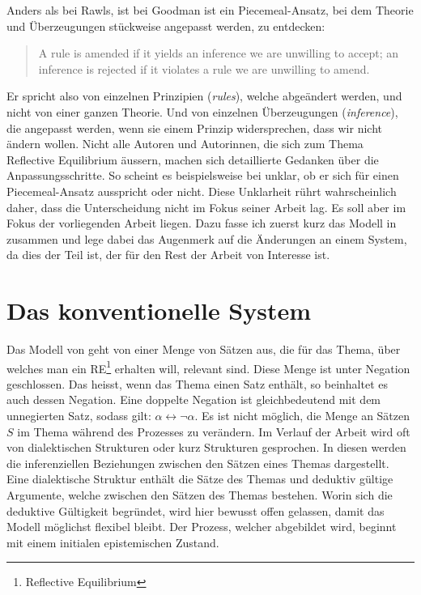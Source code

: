 \documentclass{article}
\begin{document}
Anders als bei Rawls, ist bei Goodman ist ein Piecemeal-Ansatz, bei dem Theorie und Überzeugungen stückweise angepasst werden, zu entdecken:

\begin{quote}
    A rule is amended if it yields an inference we are unwilling to accept; an inference is rejected if it violates a rule we are unwilling to amend. \parencite[S.~64]{goodman_fact_1983}
\end{quote}

Er spricht also von einzelnen Prinzipien (\textit{rules}), welche abgeändert werden, und nicht von einer ganzen Theorie. Und von einzelnen Überzeugungen (\textit{inference}), die angepasst werden, wenn sie einem Prinzip widersprechen, dass wir nicht ändern wollen. Nicht alle Autoren und Autorinnen, die sich zum Thema Reflective Equilibrium äussern, machen sich detaillierte Gedanken über die Anpassungsschritte. So scheint es beispielsweise bei \cite{tersman_reflective_1993} unklar, ob er sich für einen Piecemeal-Ansatz ausspricht oder nicht. Diese Unklarheit rührt wahrscheinlich daher, dass die Unterscheidung nicht im Fokus seiner Arbeit lag. Es soll aber im Fokus der vorliegenden Arbeit liegen. Dazu fasse ich zuerst kurz das Modell in \cite{beisbart_making_2021} zusammen und lege dabei das Augenmerk auf die Änderungen an einem System, da dies der Teil ist, der für den Rest der Arbeit von Interesse ist.

\section{Das konventionelle System}

Das Modell von \citeauthor{beisbart_making_2021} geht von einer Menge von Sätzen aus, die für das Thema, über welches man ein RE\footnote{Reflective Equilibrium} erhalten will, relevant sind. Diese Menge ist unter Negation geschlossen. Das heisst, wenn das Thema einen Satz enthält, so beinhaltet es auch dessen Negation. Eine doppelte Negation ist gleichbedeutend mit dem unnegierten Satz, sodass gilt: $\alpha \leftrightarrow \neg \alpha$. Es ist nicht möglich, die Menge an Sätzen $S$ im Thema während des Prozesses zu verändern. Im Verlauf der Arbeit wird oft von dialektischen Strukturen oder kurz Strukturen gesprochen. In diesen werden die inferenziellen Beziehungen zwischen den Sätzen eines Themas dargestellt. Eine dialektische Struktur enthält die Sätze des Themas und deduktiv gültige Argumente, welche zwischen den Sätzen des Themas bestehen. Worin sich die deduktive Gültigkeit begründet, wird hier bewusst offen gelassen, damit das Modell möglichst flexibel bleibt. Der Prozess, welcher abgebildet wird, beginnt mit einem initialen epistemischen Zustand. \parencite[vgl.][S.~443~f.]{beisbart_making_2021}
\end{document}
